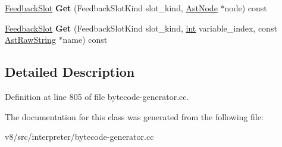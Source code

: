 \begin{DoxyCompactItemize}
\item 
\mbox{\label{classv8_1_1internal_1_1interpreter_1_1BytecodeGenerator_1_1FeedbackSlotCache_a8ec119122d1536c62b3ced983cdcd7eb}} 
\mbox{\hyperlink{classv8_1_1internal_1_1FeedbackSlot}{Feedback\+Slot}} {\bfseries Get} (Feedback\+Slot\+Kind slot\+\_\+kind, \mbox{\hyperlink{classv8_1_1internal_1_1AstNode}{Ast\+Node}} $\ast$node) const
\item 
\mbox{\label{classv8_1_1internal_1_1interpreter_1_1BytecodeGenerator_1_1FeedbackSlotCache_a99fb161845018e50a92de24805cab51b}} 
\mbox{\hyperlink{classv8_1_1internal_1_1FeedbackSlot}{Feedback\+Slot}} {\bfseries Get} (Feedback\+Slot\+Kind slot\+\_\+kind, \mbox{\hyperlink{classint}{int}} variable\+\_\+index, const \mbox{\hyperlink{classv8_1_1internal_1_1AstRawString}{Ast\+Raw\+String}} $\ast$name) const
\end{DoxyCompactItemize}


\subsection{Detailed Description}


Definition at line 805 of file bytecode-\/generator.\+cc.



The documentation for this class was generated from the following file\+:\begin{DoxyCompactItemize}
\item 
v8/src/interpreter/bytecode-\/generator.\+cc\end{DoxyCompactItemize}
